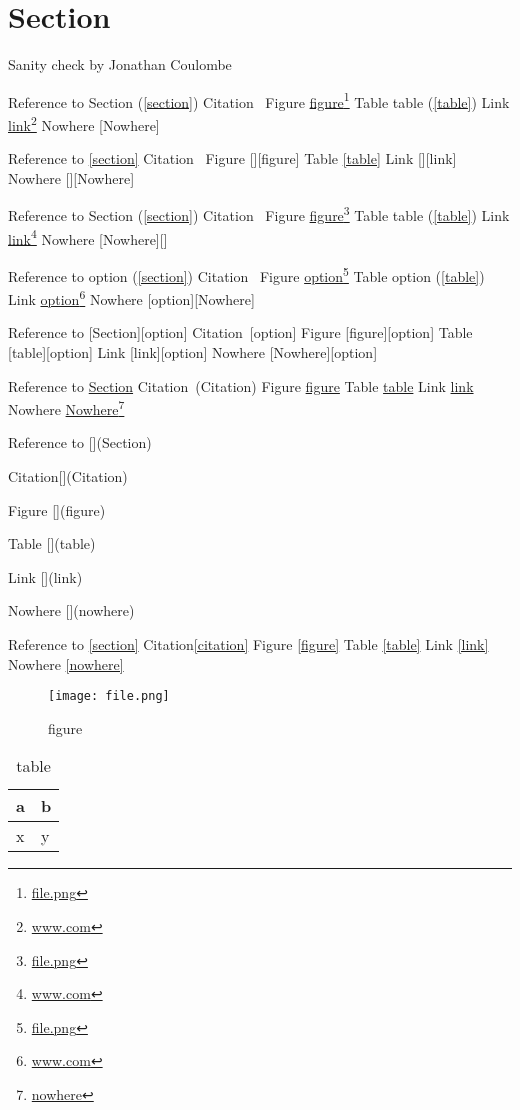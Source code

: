 
\def\mytitle{MultiMarkdown Sanity Test}
\def\latexmode{memoir}

\part{Section}
\label{section}

Sanity check by Jonathan Coulombe

Reference to Section (\autoref{section})
Citation~\citep{Citation}
Figure \href{file.png}{figure}\footnote{\href{file.png}{file.png}}
Table table (\autoref{table})
Link \href{www.com}{link}\footnote{\href{www.com}{www.com}}
Nowhere [Nowhere]

Reference to \autoref{section}
Citation~\citep{Citation}
Figure [][figure]
Table \autoref{table}
Link [][link]
Nowhere [][Nowhere]

Reference to Section (\autoref{section})
Citation~\citep{Citation}
Figure \href{file.png}{figure}\footnote{\href{file.png}{file.png}}
Table table (\autoref{table})
Link \href{www.com}{link}\footnote{\href{www.com}{www.com}}
Nowhere [Nowhere][]

Reference to option (\autoref{section})
Citation~\citep[option]{Citation}
Figure \href{file.png}{option}\footnote{\href{file.png}{file.png}}
Table option (\autoref{table})
Link \href{www.com}{option}\footnote{\href{www.com}{www.com}}
Nowhere [option][Nowhere]

Reference to [Section][option]
Citation~\citep{Citation}[option]
Figure [figure][option]
Table [table][option]
Link [link][option]
Nowhere [Nowhere][option]

Reference to \href{Section}{Section}
Citation~\citep{Citation}(Citation)
Figure \href{figure}{figure}
Table \href{table}{table}
Link \href{link}{link}
Nowhere \href{nowhere}{Nowhere}\footnote{\href{nowhere}{nowhere}}

Reference to [](Section)

Citation[](Citation)

Figure [](figure)

Table [](table)

Link [](link)

Nowhere [](nowhere)

Reference to \autoref{section}
Citation\autoref{citation}
Figure \autoref{figure}
Table \autoref{table}
Link \autoref{link}
Nowhere \autoref{nowhere}

\begin{figure}[htbp]
\centering
\texttt{[image: file.png]}
\caption{figure}
\label{figure}
\end{figure}



\begin{table}[htbp]
\begin{minipage}{\linewidth}
\setlength{\tymax}{0.5\linewidth}
\centering
\small
\caption{table}
\label{table}
\begin{tabular}{@{}ll@{}} \toprule
a&b\\
\midrule
x&y\\

\bottomrule

\end{tabular}
\end{minipage}
\end{table}





